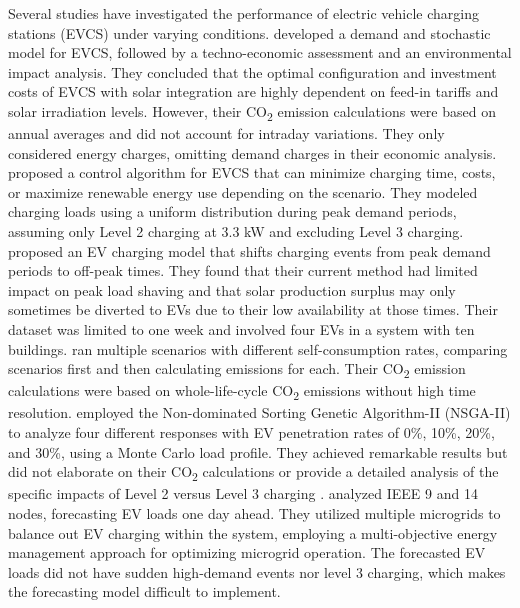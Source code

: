 \documentclass[conference]{IEEEtran}
\begin{document}
  		Several studies have investigated the performance of electric vehicle charging stations (EVCS) under varying conditions. \cite{himabindu2021analysis} developed a demand and stochastic model for EVCS, followed by a techno-economic assessment and an environmental impact analysis. They concluded that the optimal configuration and investment costs of EVCS with solar integration are highly dependent on feed-in tariffs and solar irradiation levels. However, their CO\textsubscript{2} emission calculations were based on annual averages and did not account for intraday variations. They only considered energy charges, omitting demand charges in their economic analysis. \cite{yoon2017economic} proposed a control algorithm for EVCS that can minimize charging time, costs, or maximize renewable energy use depending on the scenario. They modeled charging loads using a uniform distribution during peak demand periods, assuming only Level 2 charging at 3.3 kW and excluding Level 3 charging. \cite{purvins2018electric} proposed an EV charging model that shifts charging events from peak demand periods to off-peak times. They found that their current method had limited impact on peak load shaving and that solar production surplus may only sometimes be diverted to EVs due to their low availability at those times. Their dataset was limited to one week and involved four EVs in a system with ten buildings. \cite{Khemir} ran multiple scenarios with different self-consumption rates, comparing scenarios first and then calculating emissions for each. Their CO\textsubscript{2} emission calculations were based on whole-life-cycle CO\textsubscript{2} emissions without high time resolution. \cite{huang2023multi} employed the Non-dominated Sorting Genetic Algorithm-II (NSGA-II) to analyze four different responses with EV penetration rates of 0\%, 10\%, 20\%, and 30\%, using a Monte Carlo load profile. They achieved remarkable results but did not elaborate on their CO\textsubscript{2} calculations or provide a detailed analysis of the specific impacts of Level 2 versus Level 3 charging . \cite{tan2020multi} analyzed IEEE 9 and 14 nodes, forecasting EV loads one day ahead. They utilized multiple microgrids to balance out EV charging within the system, employing a multi-objective energy management approach for optimizing microgrid operation. The forecasted EV loads did not have sudden high-demand events nor level 3 charging, which makes the forecasting model difficult to implement. 
  		
\end{document}

